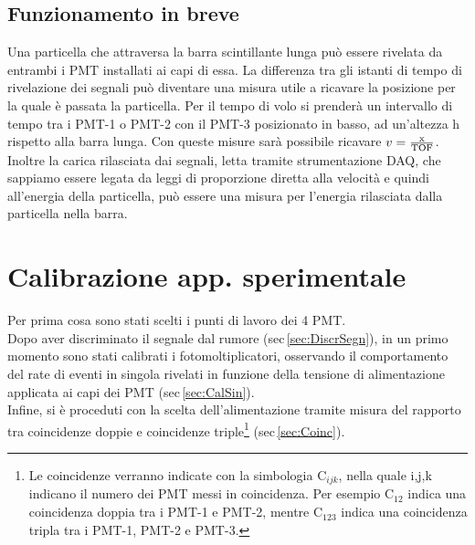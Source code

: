 \documentclass[a4paper,twocolumn]{article}
\begin{document}
\subsection{Funzionamento in breve}
Una particella che attraversa la barra scintillante lunga può essere rivelata da entrambi i PMT installati ai capi di essa. La differenza tra gli istanti di tempo di rivelazione dei segnali può diventare una misura utile a ricavare la posizione per la quale è passata la particella. Per il tempo di volo si prenderà un intervallo di tempo tra i PMT-1 o PMT-2 con il PMT-3 posizionato in basso, ad un'altezza h rispetto alla barra lunga. Con queste misure sarà possibile ricavare $v=\frac{\textnormal{x}}{\textnormal{TOF}}$.\\
Inoltre la carica rilasciata dai segnali, letta tramite strumentazione DAQ, che sappiamo essere legata da leggi di proporzione diretta alla velocità e quindi all'energia della particella, può essere una misura per l'energia rilasciata dalla particella nella barra.

\section{Calibrazione app. sperimentale}
Per prima cosa sono stati scelti i punti di lavoro dei 4 PMT.\\
Dopo aver discriminato il segnale dal rumore (sec\,\ref{sec:DiscrSegn}), in un primo momento sono stati calibrati i fotomoltiplicatori, osservando il comportamento del rate di eventi in singola rivelati in funzione della tensione di alimentazione applicata ai capi dei PMT (sec\,\ref{sec:CalSin}).\\
Infine, si è proceduti con la scelta dell'alimentazione tramite misura del rapporto tra coincidenze doppie e coincidenze triple\footnote{Le coincidenze verranno indicate con la simbologia C$_{ijk}$, nella quale i,j,k indicano il numero dei PMT messi in coincidenza. Per esempio C$_{12}$ indica una coincidenza doppia tra i PMT-1 e PMT-2, mentre C$_{123}$ indica una coincidenza tripla tra i PMT-1, PMT-2 e PMT-3.} (sec\,\ref{sec:Coinc}).
\end{document}
